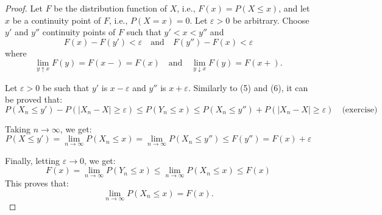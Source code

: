 \begin{proof}
Let \( F \) be the distribution function of \( X \), i.e., \( F(x) = P(X \leq x) \), and let \( x \) be a continuity point of \( F \), i.e., \( P(X=x) = 0 \). Let \( \varepsilon > 0 \) be arbitrary. Choose \( y' \) and \( y'' \) continuity points of \( F \) such that \( y' < x < y'' \) and
\[
F(x) - F(y') < \varepsilon \quad \text{and} \quad F(y'') - F(x) < \varepsilon
\]
where
\[
\lim_{y \uparrow x} F(y) = F(x-) = F(x) \quad \text{and} \quad \lim_{y \downarrow x} F(y) = F(x+).
\]

Let \( \varepsilon > 0 \) be such that \( y' \) is \( x - \varepsilon \) and \( y'' \) is \( x + \varepsilon \). Similarly to (5) and (6), it can be proved that:
\[
P(X_n \leq y') - P(|X_n - X| \geq \varepsilon) \leq P(Y_n \leq x) \leq P(X_n \leq y'') + P(|X_n - X| \geq \varepsilon) \quad \text{(exercise)}
\]

Taking \( n \to \infty \), we get:
\[
P(X \leq y') = \lim_{n \to \infty} P(X_n \leq x) = \lim_{n \to \infty} P(X_n \leq y'') \leq F(y'') = F(x) + \varepsilon
\]

Finally, letting \( \varepsilon \to 0 \), we get:
\[
F(x) = \lim_{n \to \infty} P(Y_n \leq x) \leq \lim_{n \to \infty} P(X_n \leq x) \leq F(x)
\]
This proves that:
\[
\lim_{n \to \infty} P(X_n \leq x) = F(x).
\]
\end{proof}